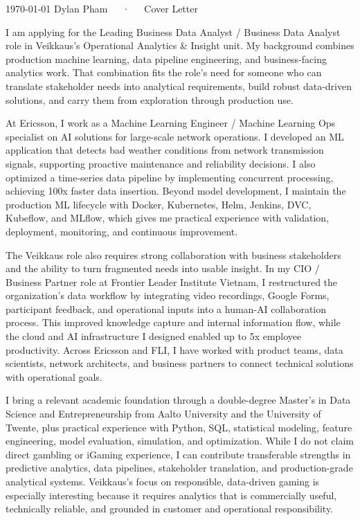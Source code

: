 \documentclass[11pt, a4paper]{awesome-cv}
\begin{document}
\makecvheader[R]

\makecvfooter
  {\today}
  {Dylan Pham~~~·~~~Cover Letter}
  {}

\makelettertitle

\begin{cvletter}

I am applying for the Leading Business Data Analyst / Business Data Analyst role in Veikkaus's Operational Analytics \& Insight unit. My background combines production machine learning, data pipeline engineering, and business-facing analytics work. That combination fits the role's need for someone who can translate stakeholder needs into analytical requirements, build robust data-driven solutions, and carry them from exploration through production use.

At Ericsson, I work as a Machine Learning Engineer / Machine Learning Ops specialist on AI solutions for large-scale network operations. I developed an ML application that detects bad weather conditions from network transmission signals, supporting proactive maintenance and reliability decisions. I also optimized a time-series data pipeline by implementing concurrent processing, achieving 100x faster data insertion. Beyond model development, I maintain the production ML lifecycle with Docker, Kubernetes, Helm, Jenkins, DVC, Kubeflow, and MLflow, which gives me practical experience with validation, deployment, monitoring, and continuous improvement.

The Veikkaus role also requires strong collaboration with business stakeholders and the ability to turn fragmented needs into usable insight. In my CIO / Business Partner role at Frontier Leader Institute Vietnam, I restructured the organization's data workflow by integrating video recordings, Google Forms, participant feedback, and operational inputs into a human-AI collaboration process. This improved knowledge capture and internal information flow, while the cloud and AI infrastructure I designed enabled up to 5x employee productivity. Across Ericsson and FLI, I have worked with product teams, data scientists, network architects, and business partners to connect technical solutions with operational goals.

I bring a relevant academic foundation through a double-degree Master's in Data Science and Entrepreneurship from Aalto University and the University of Twente, plus practical experience with Python, SQL, statistical modeling, feature engineering, model evaluation, simulation, and optimization. While I do not claim direct gambling or iGaming experience, I can contribute transferable strengths in predictive analytics, data pipelines, stakeholder translation, and production-grade analytical systems. Veikkaus's focus on responsible, data-driven gaming is especially interesting because it requires analytics that is commercially useful, technically reliable, and grounded in customer and operational responsibility.


\end{cvletter}
\end{document}
